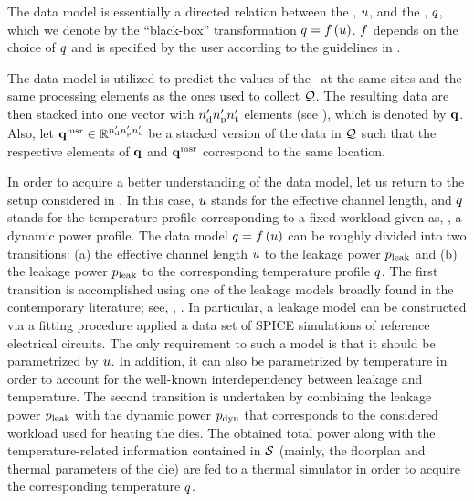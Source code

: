 The data model is essentially a directed relation between the \qoi, $u$, and the \qom, $q$, which we denote by the ``black-box'' transformation $\q = \oBB{\u}$.
$\oBB$ depends on the choice of $q$ and is specified by the user according to the guidelines in .

The data model is utilized to predict the values of the \qom\ at the same sites and the same processing elements as the ones used to collect $\mathcal{Q}$.
The resulting data are then stacked into one vector with ${n_\text{d}'} {n_\text{p}'} {n_\text{t}'}$ elements (see ), which is denoted by $\mathbf{q}$.
Also, let $\mathbf{q}^{\text{msr}} \in \mathbb{R}^{{n_\text{d}'} {n_\text{p}'} {n_\text{t}'}}$ be a stacked version of the data in $\mathcal{Q}$ such that the respective elements of $\mathbf{q}$ and $\mathbf{q}^{\text{msr}}$ correspond to the same location.

In order to acquire a better understanding of the data model, let us return to the setup considered in .
In this case, $u$ stands for the effective channel length, and $q$ stands for the temperature profile corresponding to a fixed workload given as, \eg, a dynamic power profile.
The data model $\q = \oBB{\u}$ can be roughly divided into two transitions: (a) the effective channel length $u$ to the leakage power $p_{\text{leak}}$ and (b) the leakage power $p_{\text{leak}}$ to the corresponding temperature profile $q$.
The first transition is accomplished using one of the leakage models broadly found in the contemporary literature; see, \eg, \cite{chandrakasan2001, srivastava2010, juan2012}.
In particular, a leakage model can be constructed via a fitting procedure applied a data set of SPICE simulations of reference electrical circuits.
The only requirement to such a model is that it should be parametrized by $u$.
In addition, it can also be parametrized by temperature in order to account for the well-known interdependency between leakage and temperature.
The second transition is undertaken by combining the leakage power $p_{\text{leak}}$ with the dynamic power $p_{\text{dyn}}$ that corresponds to the considered workload used for heating the dies.
The obtained total power along with the temperature-related information contained in $\mathcal{S}$ (mainly, the floorplan and thermal parameters of the die) are fed to a thermal simulator in order to acquire the corresponding temperature $q$.
